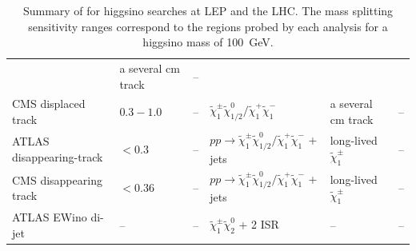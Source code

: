 \documentclass[letterpaper,11pt]{article}
\def\to{\rightarrow}
\begin{document}
\begin{table}[t]
{\begin{tabular}{l
                ll
                l
                ll
                }
  & a several cm track
  & --  
\\
CMS displaced track~\cite{CMS:2025twk}
& $0.3 - 1.0$ 	& -- 
& $\tilde{\chi}_1^\pm \tilde{\chi}_{1/2}^0 / \tilde{\chi}_1^+ \tilde{\chi}_1^-$
& a several cm track	&	-- 
\\
ATLAS disappearing-track~\cite{ATLAS:2022rme} 
  & $< 0.3$  & --
  & $pp \to \tilde{\chi}_1^\pm \tilde{\chi}_{1/2}^0 / \tilde{\chi}_1^+ \tilde{\chi}_1^- $ + jets 
  & long-lived $\tilde{\chi}_1^\pm$ 
  & -- 
\\
CMS disappearing track~\cite{CMS:2023mny}
 & $< 0.36 $	& -- 
 & $pp \to \tilde{\chi}_1^\pm \tilde{\chi}_{1/2}^0 / \tilde{\chi}_1^+ \tilde{\chi}_1^- $ + jets 
 & long-lived $\tilde{\chi}_1^\pm $	& -- 
  \\
ATLAS EWino di-jet~\cite{ATLAS:2024woy}
  & -- & --  & $\tilde{\chi}_1^\pm \tilde{\chi}_2^0$ + 2 ISR 
  & -- & --
\\
\bottomrule
\end{tabular}
}
\caption{\label{tab:exp} Summary of for higgsino searches at LEP and the LHC. The mass splitting sensitivity ranges correspond to the regions probed by each analysis for a higgsino mass of 100~GeV.
}
\label{tab:higgsino_masssplitting}
\end{table}
\end{document}
